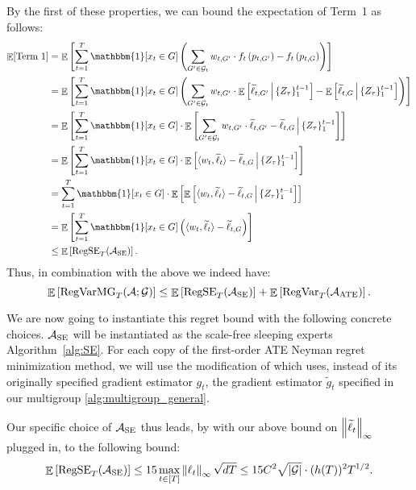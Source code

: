     By the first of these properties, we can bound the expectation of Term~1 as follows:
    \begin{align*}
        \E[\text{Term 1}] &= \E \left[\sum_{t=1}^T \mathbbm{1}[x_t \in G] \left( \sum_{G' \in \cG_t}  w_{t, G'} \cdot f_t \left(p_{t, G'} \right) - f_t \left(p_{t, G} \right) \right) \right] \\
        &= \E \left[\sum_{t=1}^T \mathbbm{1}[x_t \in G] \left( \sum_{G' \in \cG_t}  w_{t, G'} \cdot \E\left[\widetilde{\ell}_{t, G'} \, \Big|  \, \{Z_\tau\}_1^{t-1} \right] - \E\left[ \widetilde{\ell}_{t, G} \, \Big|  \, \{Z_\tau\}_1^{t-1} \right] \right) \right] \\
        &= \E \left[\sum_{t=1}^T \mathbbm{1}[x_t \in G] \cdot \E\left[ \sum_{G' \in \cG_t}  w_{t, G'} \cdot \widetilde{\ell}_{t, G'} - \widetilde{\ell}_{t, G} \, \Big|  \, \{Z_\tau\}_1^{t-1} \right] \right] \\
        &= \E \left[\sum_{t=1}^T \mathbbm{1}[x_t \in G] \cdot \E\left[ \langle  w_t, \widetilde{\ell}_t \rangle - \widetilde{\ell}_{t, G} \, \Big|  \, \{Z_\tau\}_1^{t-1} \right] \right] \\
        &= \sum_{t=1}^T \mathbbm{1}[x_t \in G] \cdot \E \left[ \E\left[ \langle  w_t, \widetilde{\ell}_t \rangle - \widetilde{\ell}_{t, G} \, \Big|  \, \{Z_\tau\}_1^{t-1} \right] \right] \\
        &= \E \left[ \sum_{t=1}^T \mathbbm{1}[x_t \in G] \left(\langle  w_t, \widetilde{\ell}_t \rangle - \widetilde{\ell}_{t, G} \right) \right] \\
        &\leq \E \left[\RegSE_T(\cA_\mathrm{SE}) \right].
    \end{align*}
    Thus, in combination with the above we indeed have:
    \[\mathop{\mathbb{E}} \left[\mathrm{RegVarMG}_T(\mathcal{A}; \mathcal{G}) \right] \leq \mathop{\mathbb{E}} \left[\mathrm{RegSE}_T(\mathcal{A}_\mathrm{SE}) \right] + \mathop{\mathbb{E}} \left[\mathrm{RegVar}_T(\mathcal{A}_\mathrm{ATE}) \right].\]

    We are now going to instantiate this regret bound with the following concrete choices. $\mathcal{A}_\mathrm{SE}$ will be instantiated as the scale-free sleeping experts Algorithm~\ref{alg:SE}. For each copy of the first-order ATE Neyman regret minimization method, we will use the modification of \ClipOGDSC which uses, instead of its originally specified gradient estimator $g_t$, the gradient estimator $\widetilde{g}_t$ specified in our multigroup \cref{alg:multigroup_general}.

    Our specific choice of $\mathcal{A}_\mathrm{SE}$ thus leads, by  with our above bound on $\left\lVert\widetilde{\ell}_{t}\right\rVert_\infty$ plugged in, to the following bound:
    \[
    \mathop{\mathbb{E}} \left[\mathrm{RegSE}_T(\mathcal{A}_\mathrm{SE}) \right] \leq 15 \max_{t \in [T]} \left\lVert\ell_t\right\rVert_\infty \sqrt{d T} \leq 15 C^2 \sqrt{|\mathcal{G}|} \cdot (h(T))^2 T^{1/2}. 
    \]

